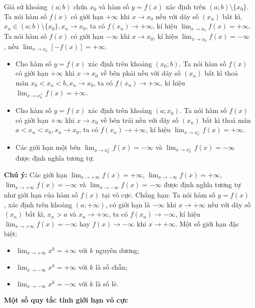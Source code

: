 \documentclass[12pt,a4paper]{extarticle}
\begin{document}
\noindent Giả sử khoảng $(a; b)$ chứa $x_0$ và hàm số $y = f(x)$ xác định trên $(a; b) \setminus \{x_0\}$. Ta nói hàm số $f(x)$ có giới hạn $+\infty$ khi $x \to x_0$ nếu với dãy số $(x_n)$ bất kì, $x_n \in (a; b) \setminus \{x_0\}, x_n \to x_0$, ta có $f(x_n) \to +\infty$, kí hiệu $\lim_{x \to x_0} f(x) = +\infty$.
\noindent Ta nói hàm số $f(x)$ có giới hạn $-\infty$ khi $x \to x_0$, kí hiệu $\lim_{x \to x_0} f(x) = -\infty$, nếu $\lim_{x \to x_0} [-f(x)] = +\infty$.
\vspace{0.4cm}
\begin{itemize}
    \item Cho hàm số $y = f(x)$ xác định trên khoảng $(x_0; b)$. Ta nói hàm số $f(x)$ có giới hạn $+\infty$ khi $x \to x_0$ về bên phải nếu với dãy số $(x_n)$ bất kì thoả mãn $x_0 < x_n < b, x_n \to x_0$, ta có $f(x_n) \to +\infty$, kí hiệu $\lim_{x \to x_0^+} f(x) = +\infty$.
    \item Cho hàm số $y = f(x)$ xác định trên khoảng $(a; x_0)$. Ta nói hàm số $f(x)$ có giới hạn $+\infty$ khi $x \to x_0$ về bên trái nếu với dãy số $(x_n)$ bất kì thoả mãn $a < x_n < x_0, x_n \to x_0$, ta có $f(x_n) \to +\infty$, kí hiệu $\lim_{x \to x_0^-} f(x) = +\infty$.
    \item Các giới hạn một bên $\lim_{x \to x_0^+} f(x) = -\infty$ và $\lim_{x \to x_0^-} f(x) = -\infty$ được định nghĩa tương tự.
\end{itemize}
\vspace{0.4cm}
\noindent\textbf{Chú ý:} Các giới hạn $\lim_{x \to +\infty} f(x) = +\infty$, $\lim_{x \to -\infty} f(x) = +\infty$, $\lim_{x \to +\infty} f(x) = -\infty$ và $\lim_{x \to -\infty} f(x) = -\infty$ được định nghĩa tương tự như giới hạn của hàm số $f(x)$ tại vô cực. Chẳng hạn:
\noindent Ta nói hàm số $y = f(x)$, xác định trên khoảng $(a; +\infty)$, có giới hạn là $-\infty$ khi $x \to +\infty$ nếu với dãy số $(x_n)$ bất kì, $x_n > a$ và $x_n \to +\infty$, ta có $f(x_n) \to -\infty$, kí hiệu $\lim_{x \to +\infty} f(x) = -\infty$ hay $f(x) \to -\infty$ khi $x \to +\infty$. Một số giới hạn đặc biệt:
\begin{itemize}
    \item $\lim_{x \to +\infty} x^k = +\infty$ với $k$ nguyên dương;
    \item $\lim_{x \to -\infty} x^k = +\infty$ với $k$ là số chẵn;
    \item $\lim_{x \to -\infty} x^k = -\infty$ với $k$ là số lẻ.
\end{itemize}

\noindent\textbf{Một số quy tắc tính giới hạn vô cực}
\end{document}
